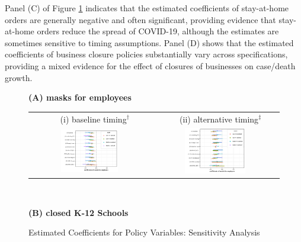 \documentclass[11pt,reqno,letter]{amsart}
\theoremstyle{definition}
\begin{document}
Panel (C) of Figure  \ref{fig:whisker} indicates that the estimated coefficients of stay-at-home orders  are generally negative and often significant, providing evidence that stay-at-home orders reduce the spread of COVID-19, although the estimates are sometimes sensitive to timing assumptions.  Panel (D) shows that the estimated coefficients of business closure policies substantially vary across specifications, providing a mixed evidence for the effect of closures of businesses on case/death growth.

\begin{figure}[ht]
  \caption{Estimated Coefficients for  Policy Variables: Sensitivity Analysis \label{fig:whisker}}\bigskip
  \begin{minipage}{\linewidth}
    \centering
   {\textbf{(A)  masks for employees}}\\
    \medskip
    \begin{tabular}{cc}
 $\quad$  (i) baseline timing$^\dagger$ &$\quad$ (ii) alternative timing$^\ddagger$\\
      \includegraphics[width=0.5\textwidth]{tables_and_figures/pmaskbus-whisker-14}
      &
      \includegraphics[width=0.5\textwidth]{tables_and_figures/pmaskbus-whisker-7}
    \end{tabular}
  \end{minipage} \\\smallskip
    \begin{minipage}{\linewidth}
    \centering
     {\textbf{(B)  closed K-12 Schools}}\\

\end{minipage}
\end{figure}
\end{document}
